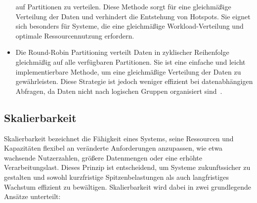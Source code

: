 \begin{itemize}
auf Partitionen zu verteilen.
Diese Methode sorgt für eine gleichmäßige Verteilung der Daten und verhindert die Entstehung von Hotspots.
Sie eignet sich besonders für Systeme, die eine gleichmäßige Workload-Verteilung und optimale Ressourcennutzung erfordern.
    \item Die Round-Robin Partitioning verteilt Daten in zyklischer Reihenfolge
gleichmäßig auf alle verfügbaren Partitionen.
Sie ist eine einfache und leicht implementierbare Methode, um eine gleichmäßige Verteilung der Daten zu gewährleisten.
Diese Strategie ist jedoch weniger effizient bei datenabhängigen Abfragen, da Daten nicht nach
logischen Gruppen organisiert sind~\cite{g4g-partitioning}.
\end{itemize}



\subsection{Skalierbarkeit}

Skalierbarkeit bezeichnet die Fähigkeit eines Systems, seine Ressourcen und Kapazitäten flexibel an
veränderte Anforderungen anzupassen, wie etwa wachsende Nutzerzahlen, größere Datenmengen oder eine erhöhte Verarbeitungslast.
Dieses Prinzip ist entscheidend, um Systeme zukunftssicher zu gestalten und sowohl kurzfristige Spitzenbelastungen als auch
langfristiges Wachstum effizient zu bewältigen.
Skalierbarkeit wird dabei in zwei grundlegende Ansätze unterteilt:

